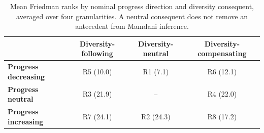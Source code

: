 \begin{table}[H]
\centering
\small
\caption{Mean Friedman ranks by nominal progress direction and diversity consequent, averaged over four granularities. A neutral consequent does not remove an antecedent from Mamdani inference.}
\label{tab:rule_semantic_grid}
\begin{tabular}{lccc}
\toprule
 & \textbf{Diversity-following} & \textbf{Diversity-neutral} & \textbf{Diversity-compensating} \\
\midrule
\textbf{Progress decreasing} & R5 (10.0) & R1 (7.1) & R6 (12.1) \\
\textbf{Progress neutral} & R3 (21.9) & -- & R4 (22.0) \\
\textbf{Progress increasing} & R7 (24.1) & R2 (24.3) & R8 (17.2) \\
\bottomrule
\end{tabular}
\end{table}
